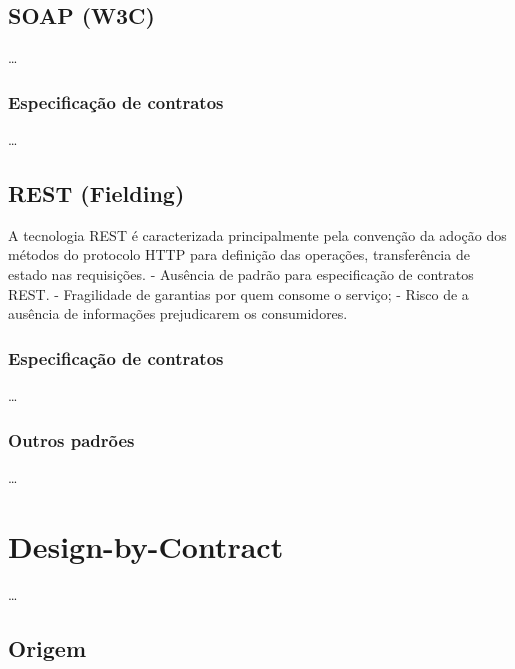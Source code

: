 \subsection{SOAP (W3C) }
\vspace{-6mm}

\ldots

\subsubsection{Especificação de contratos}
\vspace{-6mm}

\ldots

\vspace{-6mm}

\subsection{REST (Fielding)}
\label{secaoREST}
\vspace{-6mm}

A tecnologia REST é caracterizada principalmente pela
convenção da adoção dos métodos do protocolo HTTP para definição das operações, transferência de estado nas requisições.
- Ausência de padrão para especificação de contratos REST.
- Fragilidade de garantias por quem consome o serviço;
- Risco de a ausência de informações prejudicarem os consumidores.

\subsubsection{Especificação de contratos}
\vspace{-6mm}

\ldots


\subsubsection{Outros padrões }
\vspace{-6mm}

\ldots

\section{Design-by-Contract}
\label{Design-by-Contract}
\vspace{-6mm}

\ldots

\subsection{Origem}
\vspace{-6mm}

